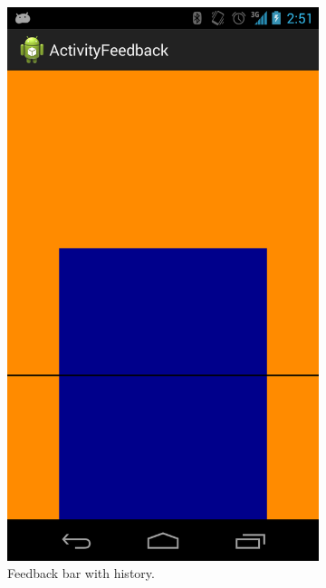 \documentclass[a4paper,10pt,english,lof,lot,twoside]{puthesis}
\begin{document}
\begin{figure}
\begin{subfigure}[t]{0.30\linewidth}
\includegraphics[width=0.800\linewidth]{early-prototype-feedback-bar-w-history.png}
\caption[Feedback bar with history]{Feedback bar with history.}\label{ch-design/index:fig-early-prototype-feedback-bar-w-history}\end{subfigure}
\begin{subfigure}[t]{0.30\linewidth}
\centering
\capstart


\end{subfigure}
\end{figure}
\end{document}
